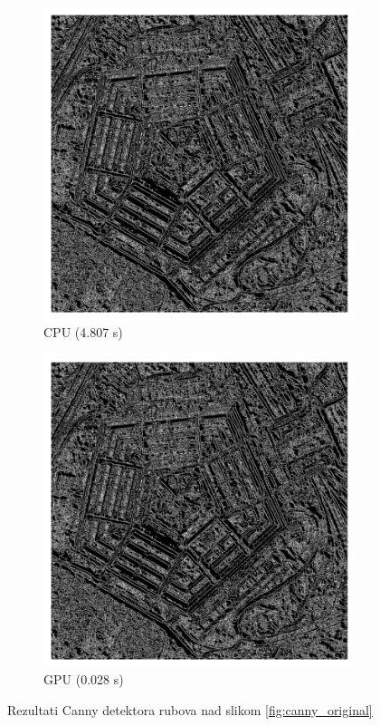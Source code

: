 \documentclass[a4paper,twocolumn]{article}
\begin{document}
	\begin{figure}[hbt]
		\centering
		\begin{subfigure}[]{0.49\linewidth}
			\includegraphics[width=1\linewidth]{slike/canny_np.png}
			\caption{CPU (4.807 s)}
			
		\end{subfigure}
		\begin{subfigure}[]{0.49\linewidth}
			\includegraphics[width=1\linewidth]{slike/canny_cp.png}
			\caption{GPU (0.028 s)}
			
		\end{subfigure}
		\caption{Rezultati Canny detektora rubova nad slikom \ref{fig:canny_original}}
		\label{fig:canny_CPU_GPU}
	\end{figure}
	
\end{document}
